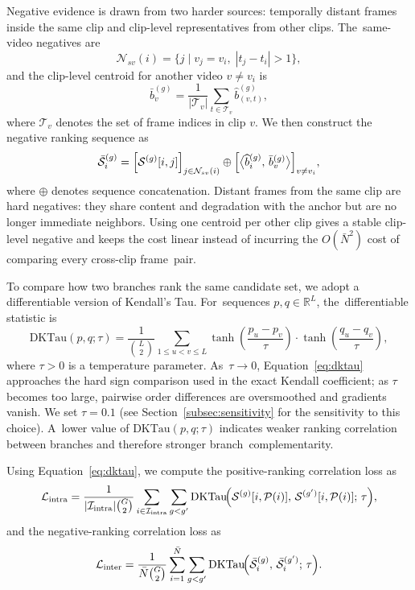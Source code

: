 \documentclass[symmetry,article,accept,pdftex,moreauthors]{Definitions/mdpi}
\begin{document}
Negative evidence is drawn from two harder sources: temporally distant frames inside the same clip and clip-level representatives from other clips. The~same-video negatives are
\begin{equation}
\mathcal{N}_{sv}(i)=
\bigl\{
j \mid v_j=v_i,\;
|t_j-t_i|>1
\bigr\},
\end{equation}
and the clip-level centroid for another video $v\neq v_i$ is
\begin{equation}
\bar{b}_{v}^{(g)} =
\frac{1}{|\mathcal{T}_v|}
\sum_{t\in\mathcal{T}_v}
\widehat{b}_{(v,t)}^{(g)},
\end{equation}
where $\mathcal{T}_v$ denotes the set of frame indices in clip $v$. We then construct the negative ranking sequence as
\begin{equation}
\bar{\mathcal{S}}_i^{(g)} =
\Bigl[\mathcal{S}^{(g)}[i,j]\Bigr]_{j\in\mathcal{N}_{sv}(i)}
\oplus
\Bigl[\bigl\langle \widehat{b}_i^{(g)},\,\bar{b}_v^{(g)} \bigr\rangle\Bigr]_{v\neq v_i},
\end{equation}
where $\oplus$ denotes sequence concatenation. Distant frames from the same clip are hard negatives: they share content and degradation with the anchor but are no longer immediate neighbors. Using one centroid per other clip gives a stable clip-level negative and keeps the cost linear instead of incurring the $O(\bar{N}^2)$ cost of comparing every cross-clip frame~pair.

To compare how two branches rank the same candidate set, we adopt a differentiable version of Kendall's Tau. For~sequences $p,q\in\mathbb{R}^{L}$, the~differentiable statistic is
\begin{equation}
\mathrm{DKTau}(p,q;\tau)
= \frac{1}{\binom{L}{2}}
\sum_{1\le u < v \le L}
\tanh\!\!\left(\frac{p_u-p_v}{\tau}\right)
\cdot
\tanh\!\!\left(\frac{q_u-q_v}{\tau}\right),
\label{eq:dktau}
\end{equation}
where $\tau>0$ is a temperature parameter. As~$\tau\rightarrow 0$, Equation~\eqref{eq:dktau} approaches the hard sign comparison used in the exact Kendall coefficient; as $\tau$ becomes too large, pairwise order differences are oversmoothed and gradients vanish. We set $\tau=0.1$ (see Section~\ref{subsec:sensitivity} for the sensitivity to this choice). A~lower value of $\mathrm{DKTau}(p,q;\tau)$ indicates weaker ranking correlation between branches and therefore stronger branch~complementarity.

Using Equation~\eqref{eq:dktau}, we compute the positive-ranking correlation loss as
\begin{equation}
\mathcal{L}_{\text{intra}} =
\frac{1}{|\mathcal{I}_{\text{intra}}| \binom{G}{2}}
\sum_{i\in\mathcal{I}_{\text{intra}}}
\sum_{g < g'}
\mathrm{DKTau}\!\Bigl(
\mathcal{S}^{(g)}[i,\mathcal{P}(i)],\,
\mathcal{S}^{(g')}[i,\mathcal{P}(i)];\,\tau
\Bigr),
\label{eq:loss_intra}
\end{equation}
and the negative-ranking correlation loss as
\begin{equation}
\mathcal{L}_{\text{inter}} =
\frac{1}{\bar{N} \binom{G}{2}}
\sum_{i=1}^{\bar{N}}
\sum_{g < g'}
\mathrm{DKTau}\!\Bigl(
\bar{\mathcal{S}}_i^{(g)},\,
\bar{\mathcal{S}}_i^{(g')};\,
\tau
\Bigr).
\end{equation}
\end{document}
